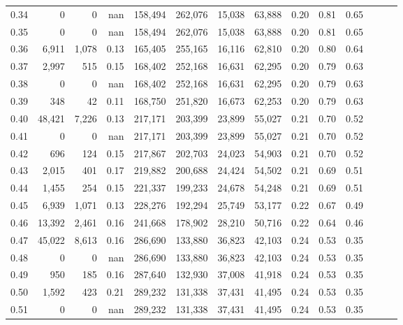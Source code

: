\begin{tabular}{rrrrrrrrrrrrrr}
0.34 &       0 &      0 &   nan &  158,494 &  262,076 &  15,038 &  63,888 &  0.20 &  0.81 &      0.65 \\
0.35 &       0 &      0 &   nan &  158,494 &  262,076 &  15,038 &  63,888 &  0.20 &  0.81 &      0.65 \\
0.36 &   6,911 &  1,078 &  0.13 &  165,405 &  255,165 &  16,116 &  62,810 &  0.20 &  0.80 &      0.64 \\
0.37 &   2,997 &    515 &  0.15 &  168,402 &  252,168 &  16,631 &  62,295 &  0.20 &  0.79 &      0.63 \\
0.38 &       0 &      0 &   nan &  168,402 &  252,168 &  16,631 &  62,295 &  0.20 &  0.79 &      0.63 \\
0.39 &     348 &     42 &  0.11 &  168,750 &  251,820 &  16,673 &  62,253 &  0.20 &  0.79 &      0.63 \\
0.40 &  48,421 &  7,226 &  0.13 &  217,171 &  203,399 &  23,899 &  55,027 &  0.21 &  0.70 &      0.52 \\
0.41 &       0 &      0 &   nan &  217,171 &  203,399 &  23,899 &  55,027 &  0.21 &  0.70 &      0.52 \\
0.42 &     696 &    124 &  0.15 &  217,867 &  202,703 &  24,023 &  54,903 &  0.21 &  0.70 &      0.52 \\
0.43 &   2,015 &    401 &  0.17 &  219,882 &  200,688 &  24,424 &  54,502 &  0.21 &  0.69 &      0.51 \\
0.44 &   1,455 &    254 &  0.15 &  221,337 &  199,233 &  24,678 &  54,248 &  0.21 &  0.69 &      0.51 \\
0.45 &   6,939 &  1,071 &  0.13 &  228,276 &  192,294 &  25,749 &  53,177 &  0.22 &  0.67 &      0.49 \\
0.46 &  13,392 &  2,461 &  0.16 &  241,668 &  178,902 &  28,210 &  50,716 &  0.22 &  0.64 &      0.46 \\
0.47 &  45,022 &  8,613 &  0.16 &  286,690 &  133,880 &  36,823 &  42,103 &  0.24 &  0.53 &      0.35 \\
0.48 &       0 &      0 &   nan &  286,690 &  133,880 &  36,823 &  42,103 &  0.24 &  0.53 &      0.35 \\
0.49 &     950 &    185 &  0.16 &  287,640 &  132,930 &  37,008 &  41,918 &  0.24 &  0.53 &      0.35 \\
0.50 &   1,592 &    423 &  0.21 &  289,232 &  131,338 &  37,431 &  41,495 &  0.24 &  0.53 &      0.35 \\
0.51 &       0 &      0 &   nan &  289,232 &  131,338 &  37,431 &  41,495 &  0.24 &  0.53 &      0.35 \\

\end{tabular}
